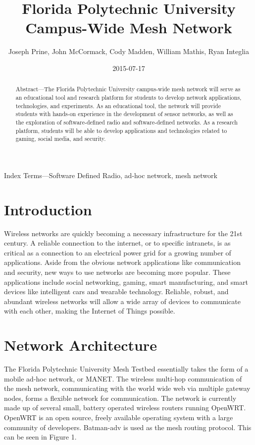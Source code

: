 \documentclass{IEEEtran}
\title{Florida Polytechnic University Campus-Wide Mesh Network}
\date{2015-07-17}
\author{Joseph Prine, John McCormack, Cody Madden, William Mathis, Ryan Integlia}
\begin{document}
\maketitle

\begin{abstract}
Abstract—The Florida Polytechnic University campus-wide mesh network will serve as an educational tool and research platform for students to develop network applications, technologies, and experiments.  As an educational tool, the network will provide students with hands-on experience in the development of sensor networks, as well as the exploration of software-defined radio and software-defined networks.  As a research platform, students will be able to develop applications and technologies related to gaming, social media, and security.
\end{abstract}
\begin{IEEEkeywords}
Index Terms—Software Defined Radio, ad-hoc network, mesh network
\end{IEEEkeywords}

\section{Introduction}
	
	Wireless networks are quickly becoming a necessary infrastructure for the 21st century.  A reliable connection to the internet, or to specific intranets, is as critical as a connection to an electrical power grid for a growing number of applications.  Aside from the obvious network applications like communication and security, new ways to use networks are becoming more popular.  These applications include social networking, gaming, smart manufacturing, and smart devices like intelligent cars and wearable technology. Reliable, robust, and abundant wireless networks will allow a wide array of devices to communicate with each other, making the Internet of Things possible.

\section{Network Architecture}

	The Florida Polytechnic University Mesh Testbed essentially takes the form of a mobile ad-hoc network, or MANET.  The wireless multi-hop communication of the mesh network, communicating with the world wide web via multiple gateway nodes, forms a flexible network for communication. The network is currently made up of several small, battery operated wireless routers running OpenWRT. OpenWRT is an open source, freely available operating system with a large community of developers. Batman-adv is used as the mesh routing protocol. This can be seen in Figure 1.  
\end{document}
